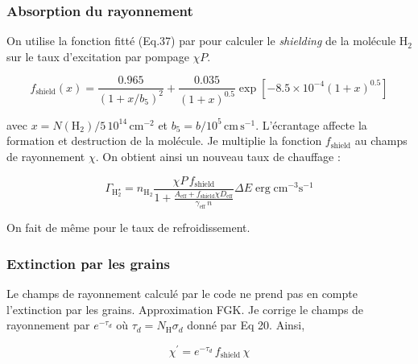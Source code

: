 \subsubsection{Absorption du rayonnement}

On utilise la fonction fitté (Eq.37) par \cite{DraineBertoldi_1996} pour calculer le \textit{shielding} de la molécule $\mathrm{H}_2$ sur le taux d'excitation par pompage $\chi P$.

$$
f_{\text {shield}}\left(x\right)=\frac{0.965}{\left(1+x / b_{5}\right)^{2}}+\frac{0.035}{(1+x)^{0.5}} \exp \left[-8.5 \times 10^{-4}(1+x)^{0.5}\right]
$$

avec $x = N(\mathrm{H}_2)/5\,10^{14} \, \mathrm{cm}^{-2}$ et $b_5 = b/10^5 \, \mathrm{cm}\,\mathrm{s}^{-1}$. L'écrantage affecte la formation et destruction de la molécule. Je multiplie la fonction $f_{\text {shield}}$ au champs de rayonnement $\chi$.
On obtient ainsi un nouveau taux de chauffage :

\begin{equation}
    \Gamma_{\mathrm{H}_2^\star} = n_{\mathrm{H}_2}\frac{\chi P \, f_{\text {shield}}}{1 + \frac{A_{\text{eff}}+  f_{\text {shield}} \chi D_{\text{eff}}}{\gamma_{\text{eff}} \, n}} \Delta E \operatorname{erg} \mathrm{cm}^{-3} \mathrm{s}^{-1}
\end{equation}



On fait de même pour le taux de refroidissement.



\subsubsection{Extinction par les grains}

Le champs de rayonnement calculé par le code ne prend pas en compte l'extinction par les grains. Approximation FGK. Je corrige le champs de rayonnement par $e^{-\tau_d}$ où $\tau_d = N_\mathrm{H}\sigma_d$ donné par \cite{SternbergLePetit2014} Eq 20. Ainsi, 

$$\chi^{'} = e^{-\tau_d
}\, f_{\mathrm{shield}}\, \chi$$


